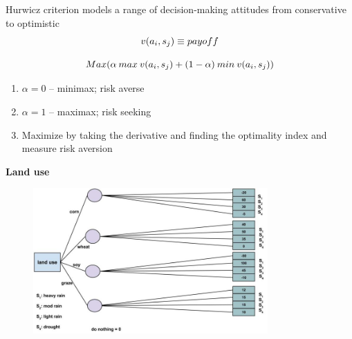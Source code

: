 \documentclass[aspectratio=1610,pdftex,dvipsnames,compress,xcolor={dvipsnames}]{beamer}
\begin{document}
\addtocounter{framenumber}{-1}
\begin{frame}{Hurwicz criterion models a range of decision-making attitudes from conservative to optimistic}
    \begin{equation}
        \LARGE
        v(a_i,s_j) \equiv payoff
    \end{equation}

    \begin{equation}
        \LARGE
        Max(\alpha \: max \: v(a_i,s_j)+(1-\alpha) \: min \: v(a_i,s_j))
    \end{equation}

    \begin{enumerate}[series=outerlist,topsep=0pt,itemsep=11pt,leftmargin=*,label=(\arabic*)]
        \item[]$\alpha = 0$ -- minimax; risk averse
        \item[]$\alpha = 1$ -- maximax; risk seeking
        \item[]Maximize by taking the derivative and finding the optimality index and measure risk aversion
    \end{enumerate}
\end{frame}


\begin{frame}[plain]{}
    \centering\LARGE\textbf{Land use}
\end{frame}


\addtocounter{framenumber}{-1}
\begin{frame}{}
    \begin{figure}
        \centering
        \includegraphics[width=0.80\textwidth]{land.use.template.jpg}
    \end{figure}
\end{frame}
\end{document}

